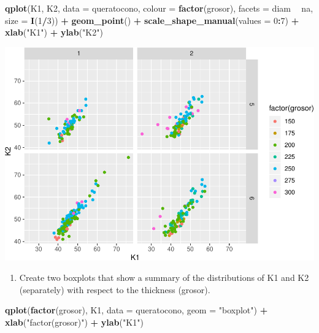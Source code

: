 \documentclass[]{article}
\newenvironment{Shaded}{\begin{snugshade}}{\end{snugshade}}
\newcommand{\DataTypeTok}[1]{\textcolor[rgb]{0.13,0.29,0.53}{#1}}
\newcommand{\DecValTok}[1]{\textcolor[rgb]{0.00,0.00,0.81}{#1}}
\newcommand{\KeywordTok}[1]{\textcolor[rgb]{0.13,0.29,0.53}{\textbf{#1}}}
\newcommand{\NormalTok}[1]{#1}
\newcommand{\OperatorTok}[1]{\textcolor[rgb]{0.81,0.36,0.00}{\textbf{#1}}}
\newcommand{\StringTok}[1]{\textcolor[rgb]{0.31,0.60,0.02}{#1}}
\providecommand{\tightlist}{%
  \setlength{\itemsep}{0pt}\setlength{\parskip}{0pt}}
\begin{document}
\begin{Shaded}
\begin{Highlighting}[]
\KeywordTok{qplot}\NormalTok{(K1, K2, }\DataTypeTok{data =}\NormalTok{ queratocono, }\DataTypeTok{colour =} \KeywordTok{factor}\NormalTok{(grosor), }\DataTypeTok{facets =}\NormalTok{ diam }\OperatorTok{~}\StringTok{ }\NormalTok{na, }
      \DataTypeTok{size =} \KeywordTok{I}\NormalTok{(}\DecValTok{1}\OperatorTok{/}\DecValTok{3}\NormalTok{)) }\OperatorTok{+}
\StringTok{      }\KeywordTok{geom_point}\NormalTok{() }\OperatorTok{+}\StringTok{ }
\StringTok{      }\KeywordTok{scale_shape_manual}\NormalTok{(}\DataTypeTok{values =} \DecValTok{0}\OperatorTok{:}\DecValTok{7}\NormalTok{) }\OperatorTok{+}
\StringTok{      }\KeywordTok{xlab}\NormalTok{(}\StringTok{"K1"}\NormalTok{) }\OperatorTok{+}\StringTok{ }\KeywordTok{ylab}\NormalTok{(}\StringTok{"K2"}\NormalTok{)}
\end{Highlighting}
\end{Shaded}

\includegraphics{document_files/figure-latex/unnamed-chunk-7-1.pdf}

\begin{enumerate}
\def\labelenumi{\arabic{enumi}.}
\setcounter{enumi}{5}
\tightlist
\item
  Create two boxplots that show a summary of the distributions of K1 and
  K2 (separately) with respect to the thickness (grosor).
\end{enumerate}

\begin{Shaded}
\begin{Highlighting}[]
\KeywordTok{qplot}\NormalTok{(}\KeywordTok{factor}\NormalTok{(grosor), K1, }\DataTypeTok{data =}\NormalTok{ queratocono, }\DataTypeTok{geom =} \StringTok{"boxplot"}\NormalTok{) }\OperatorTok{+}
\StringTok{  }\KeywordTok{xlab}\NormalTok{(}\StringTok{"factor(grosor)"}\NormalTok{) }\OperatorTok{+}\StringTok{ }\KeywordTok{ylab}\NormalTok{(}\StringTok{"K1"}\NormalTok{)}
\end{Highlighting}
\end{Shaded}
\end{document}
